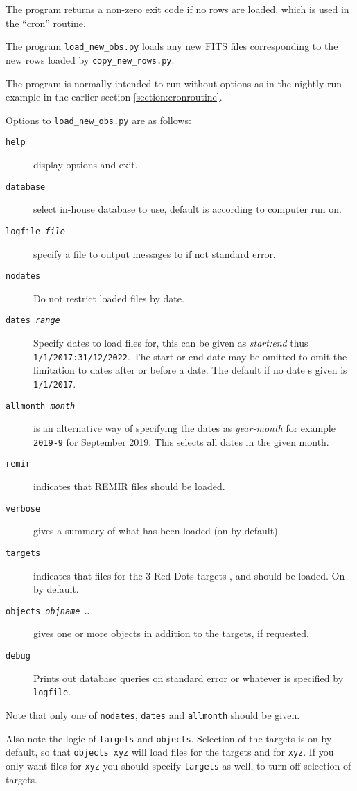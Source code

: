 The program returns a non-zero exit code if no rows are loaded, which is used in
the ``cron'' routine.

\protect\label{section:loadnewobs}

The program \texttt{load\_new\_obs.py} loads any new FITS files corresponding to
the new rows loaded by \texttt{copy\_new\_rows.py}.

The program is normally intended to run without options as in the nightly run
example in the earlier section \ref{section:cronroutine}.

Options to \texttt{load\_new\_obs.py} are as follows:

\begin{description}
\item[\tt \dmin help] display options and exit.
\item[\tt \dmin database] select in-house database to use, default is according
to computer run on.
\item[\tt \dmin logfile \textit{file}] specify a file to output messages to if
not standard error.
\item[\tt \dmin nodates] Do not restrict loaded files by date.
\item[\tt \dmin dates \textit{range}] Specify dates to load files for, this can
be given as \textit{start:end} thus \texttt{1/1/2017:31/12/2022}. The start or
end date may be omitted to omit the limitation to dates after or before a date.
The default if no date s given is \texttt{1/1/2017}.
\item[\tt \dmin allmonth \textit{month}] is an alternative way of specifying the
dates as \textit{year-month} for example \texttt{2019-9} for September 2019.
This selects all dates in the given month.
\item[\tt \dmin remir] indicates that REMIR files should be loaded.
\item[\tt \dmin verbose] gives a summary of what has been loaded (on by
default).
\item[\tt \dmin targets] indicates that files for the 3 Red Dots targets \prox,
{\bstar} and {\ross} should be loaded. On by default.
\item[\tt \dmin objects \textit{objname \ldots}] gives one or more objects in
addition to the targets, if requested.
\item[\tt \dmin debug] Prints out database queries on standard error or whatever
is specified by \texttt{\dmin logfile}.
\end{description}

Note that only one of \texttt{\dmin nodates}, \texttt{\dmin dates} and
\texttt{\dmin allmonth} should be given.

Also note the logic of \texttt{\dmin targets} and \texttt{\dmin objects}.
Selection of the targets is on by default, so that \texttt{\dmin objects~xyz}
will load files for the targets and for \texttt{xyz}. If you only want files for
\texttt{xyz} you should specify \texttt{\dmin targets} as well, to turn off
selection of targets.
